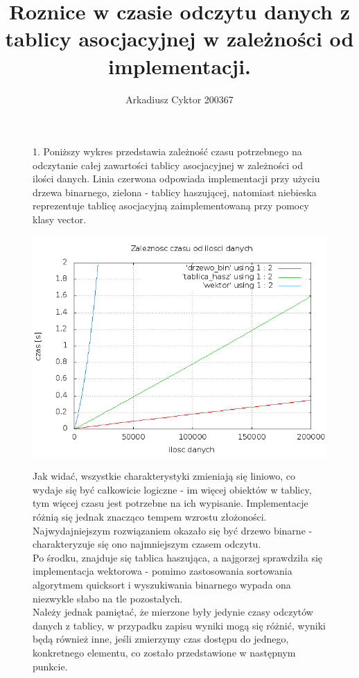 \documentclass[a4paper,11pt]{report}
\title{Roznice w czasie odczytu danych z tablicy asocjacyjnej w zależności od implementacji.}
\author{Arkadiusz Cyktor 200367}
\begin{document}
\maketitle


\begin{figure}
  1. Poniższy wykres przedstawia zależność czasu potrzebnego na odczytanie całej zawartości tablicy asocjacyjnej w zależności od ilości danych.
   Linia czerwona odpowiada implementacji przy użyciu drzewa binarnego, zielona - tablicy haszującej, natomiast niebieska reprezentuje tablicę asocjacyjną zaimplementowaną przy pomocy klasy vector.
  \\\begin{center} \includegraphics[scale=0.55]{./drzewo_bin+tablica_hasz.png}\end{center}
  Jak widać, wszystkie charakterystyki zmieniają się liniowo, co wydaje się być całkowicie logiczne - im więcej obiektów w tablicy, tym więcej czasu jest potrzebne na ich wypisanie. Implementacje różnią się jednak znacząco tempem wzrostu złożoności.
\\Najwydajniejszym rozwiązaniem okazało się być drzewo binarne - charakteryzuje się ono najmniejszym czasem odczytu.
\\Po środku, znajduje się tablica haszująca, a najgorzej sprawdziła się implementacja wektorowa - pomimo zastosowania sortowania algorytmem quicksort i wyszukiwania binarnego wypada ona niezwykle słabo na tle pozostałych.
\\Należy jednak pamiętać, że mierzone były jedynie czasy odczytów danych z tablicy, w przypadku zapisu wyniki mogą się różnić, wyniki będą również inne, jeśli zmierzymy czas dostępu do jednego, konkretnego elementu, co zostało przedstawione w następnym punkcie.
\end{figure}
\end{document}
